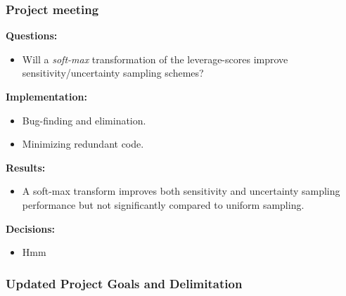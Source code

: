 \subsubsection*{Project meeting}
\textbf{Questions:}\\
\begin{itemize}
\item Will a \emph{soft-max} transformation of the leverage-scores improve sensitivity/uncertainty sampling schemes?
\end{itemize}

\textbf{Implementation:}\\
\begin{itemize}
\item Bug-finding and elimination.
\item Minimizing redundant code.
\end{itemize}

\textbf{Results:}\\
\begin{itemize}
\item A soft-max transform improves both sensitivity and uncertainty sampling performance but not significantly compared to uniform sampling. 
\end{itemize}

\textbf{Decisions:}\\
\begin{itemize}
\item Hmm
\end{itemize}

\subsubsection*{Updated Project Goals and Delimitation}




